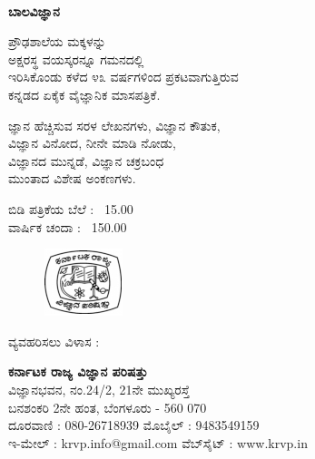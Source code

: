 
~
\thispagestyle{empty}

\begin{center}
{\LARGE\textbf{{ಬಾಲವಿಜ್ಞಾನ}}}

\vfill

ಪ್ರೌಢಶಾಲೆಯ ಮಕ್ಕಳನ್ನು\\
ಅಕ್ಷರಸ್ಥ ವಯಸ್ಕರನ್ನೂ ಗಮನದಲ್ಲಿ\\
ಇರಿಸಿಕೊಂಡು ಕಳೆದ ೪೩ ವರ್ಷಗಳಿಂದ ಪ್ರಕಟವಾಗುತ್ತಿರುವ\\
ಕನ್ನಡದ ಏಕೈಕ ವೈಜ್ಞಾನಿಕ ಮಾಸಪತ್ರಿಕೆ.

\vfill

 ಜ್ಞಾನ ಹೆಚ್ಚಿಸುವ ಸರಳ ಲೇಖನಗಳು, ವಿಜ್ಞಾನ ಕೌತುಕ,\\
ವಿಜ್ಞಾನ ವಿನೋದ, ನೀನೇ ಮಾಡಿ ನೋಡು,\\
ವಿಜ್ಞಾನದ ಮುನ್ನಡೆ, ವಿಜ್ಞಾನ ಚಕ್ರಬಂಧ\\
ಮುಂತಾದ ವಿಶೇಷ ಅಂಕಣಗಳು.\\

\vfill

ಬಿಡಿ ಪತ್ರಿಕೆಯ ಬೆಲೆ : \rupee\ 15.00\\
ವಾರ್ಷಿಕ ಚಂದಾ : \rupee\ 150.00

\vfill

\begin{figure}[H]
\centering
\includegraphics[scale=.7]{src/figure/logo.jpg}
\end{figure}

\vfill
ವ್ಯವಹರಿಸಲು ವಿಳಾಸ :

\vfill

\textbf{ಕರ್ನಾಟಕ ರಾಜ್ಯ ವಿಜ್ಞಾನ ಪರಿಷತ್ತು}\\
ವಿಜ್ಞಾನಭವನ, ನಂ.24/2, 21ನೇ ಮುಖ್ಯರಸ್ತೆ\\
ಬನಶಂಕರಿ 2ನೇ ಹಂತ, ಬೆಂಗಳೂರು - 560 070\\
ದೂರವಾಣಿ : 080-26718939   ಮೊಬೈಲ್​ : 9483549159\\
ಇ-ಮೇಲ್​ : krvp.info@gmail.com   ವೆಬ್​ಸೈಟ್​ : www.krvp.in
\end{center}

